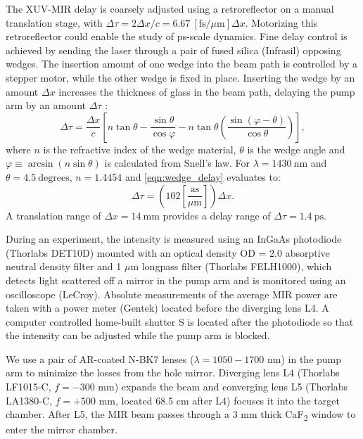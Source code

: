 The XUV-MIR delay is coarsely adjusted using a retroreflector on a manual translation stage, with $\Delta \tau = 2 \Delta x / c =  6.67 \ \left[ \textrm{fs}/ \mu \textrm{m} \right] \Delta x$. Motorizing this retroreflector could enable the study of ps-scale dynamics. Fine delay control is achieved by sending the laser through a pair of fused silica (Infrasil) opposing wedges. The insertion amount of one wedge into the beam path is controlled by a stepper motor, while the other wedge is fixed in place. Inserting the wedge by an amount $\Delta x$ increases the thickness of glass in the beam path, delaying the pump arm by an amount $\Delta \tau$ \cite{hagemanComplexAttosecondTransient2020}:
\begin{equation}
\Delta \tau = \frac{\Delta x}{c} \left[ n \tan \theta - \frac{\sin \theta}{\cos \varphi} - n \tan \theta \left( \frac{\sin \left(\varphi - \theta \right)}{\cos \theta}\right) \right],
\label{eqn:wedge_delay}
\end{equation}
where $n$ is the refractive index of the wedge material, $\theta$ is the wedge angle and ${\varphi \equiv \arcsin \left( n \sin \theta \right)}$ is calculated from Snell's law. For $\lambda = 1430 \ \textrm{nm}$ and $\theta = 4.5 \ \textrm{degrees}$, $n=1.4454$ \cite{malitsonInterspecimenComparisonRefractive1965} and \cref{eqn:wedge_delay} evaluates to:
\begin{equation}
\Delta \tau = \left( 102 \left[ \frac{\textrm{as}}{\mu \textrm{m}}\right]\right) \Delta x.
\end{equation}
A translation range of $\Delta x = 14 \ \textrm{mm}$ provides a delay range of $\Delta \tau =  1.4 \ \textrm{ps}$.

During an experiment, the intensity is measured using an InGaAs photodiode (Thorlabs DET10D) mounted with an optical density OD = 2.0 absorptive neutral density filter and 1 $\mu$m longpass filter (Thorlabs FELH1000), which detects light scattered off a mirror in the pump arm and is monitored using an oscilloscope (LeCroy). Absolute measurements of the average MIR power are taken with a power meter (Gentek) located before the diverging lens L4. A computer controlled home-built shutter S is located after the photodiode so that the intensity can be adjusted while the pump arm is blocked.

We use a pair of AR-coated N-BK7 lenses ($\lambda = 1050-1700$ nm) in the pump arm to minimize the losses from the hole mirror. Diverging lens L4 (Thorlabs LF1015-C, $f = - 300$ mm) expands the beam and converging lens L5 (Thorlabs LA1380-C, $f = + 500$ mm, located 68.5 cm after L4) focuses it into the target chamber. After L5, the MIR beam passes through a 3 mm thick CaF\textsubscript{2} window to enter the mirror chamber.

